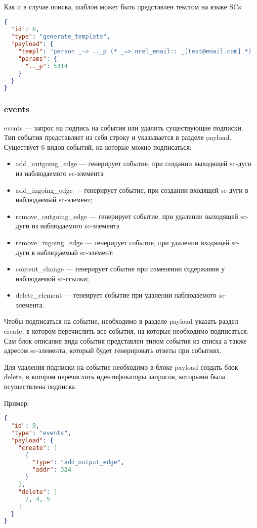 Как и в случае поиска, шаблон может быть представлен текстом на языке SCs:
\begin{lstlisting}[language=json,firstnumber=1]
{
  "id": 8,
  "type": "generate_template",
  "payload": {
    "templ": "person _-> .._p (* _=> nrel_email:: _[test@email.com] *);;",
    "params": {
      ".._p": 5314
    }
  }
}
\end{lstlisting}

\subsubsection{events}
events --- запрос на подпись на события или удалить существующие подписки. Тип события представляет из себя строку и указывается в разделе payload. Существует 6 видов событий, на которые можно подписаться:
\begin{itemize}
    \item add\_outgoing\_edge --- генерирует событие, при создании выходящей sc-дуги из наблюдаемого sc-элемента
    \item add\_ingoing\_edge --- генерирует событие, при создании входящей sc-дуги в наблюдаемый sc-элемент;
    \item remove\_outgoing\_edge --- генерирует событие, при удалении выходящей sc-дуги из наблюдаемого sc-элемента
    \item remove\_ingoing\_edge --- генерирует событие, при удалении входящей sc-дуги в наблюдаемый sc-элемент;
    \item content\_change --- генерирует событие при изменении содержания у наблюдаемой sc-ссылки;
    \item delete\_element --- генеирует событие при удалении наблюдаемого sc-элемента. 
\end{itemize}
Чтобы подписаться на событие, необходимо в разделе payload указать раздел create, в котором перечислить все события, на которые необходимо подписаться. Сам блок описания вида события представлен типом события из списка а также адресом sc-элемента, который будет генерировать ответы при событиях. 

Для удаления подписки на событие необходимо в блоке payload создать блок delete, в котором перечислить идентификаторы запросов, которыми была осуществлена подписка. 

Пример:
\begin{lstlisting}[language=json,firstnumber=1]
{
  "id": 9,
  "type": "events",
  "payload": {
    "create": [
      {
        "type": "add_output_edge",  
        "addr": 324             
      }
    ],
    "delete": [
      2, 4, 5
    ]
  }
}
\end{lstlisting}

